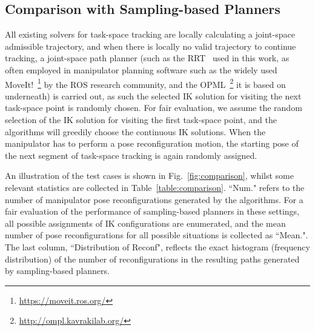 \documentclass[letterpaper, 10 pt, conference]{ieeeconf}  %
\begin{document}
\subsection{Comparison with Sampling-based Planners}\label{section:comparison}
All existing solvers for task-space tracking are locally calculating a joint-space admissible trajectory, and when there is locally no valid trajectory to continue tracking, a joint-space path planner (such as the RRT~\cite{Lavalle2006Planning} used in this work, as often employed in manipulator planning software such as the widely used  MoveIt!~\footnote{\url{https://moveit.ros.org/}} by the ROS research community, and the OPML~\footnote{\url{http://ompl.kavrakilab.org/}} it is based on underneath) is carried out, as such the selected IK solution for visiting the next task-space point is randomly chosen. 
For fair evaluation, we assume the random selection of the IK solution for visiting the first task-space point, and the algorithms will greedily choose the continuous IK solutions. 
When the manipulator has to perform a pose reconfiguration motion, the starting pose of the next segment of task-space tracking is again randomly assigned. 

An illustration of the test cases is shown in Fig.~\ref{fig:comparison}, whilst some relevant statistics %
are collected in Table~\ref{table:comparison}. 
``Num."  refers to the number of manipulator pose reconfigurations generated by the algorithms. 
For a fair evaluation of the performance of sampling-based planners in these settings, all possible assignments of IK configurations are enumerated, and the mean number of pose reconfigurations for all possible situations is collected as ``Mean.". 
The last column, ``Distribution of Reconf", reflects the exact histogram (frequency distribution) of the number of reconfigurations in the resulting paths generated by sampling-based planners. 
\end{document}
